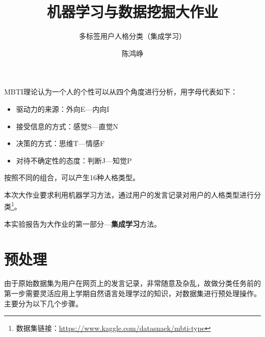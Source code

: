 \documentclass[logo,reportComp]{thesis}
\title{机器学习与数据挖掘大作业}
\subtitle{多标签用户人格分类（集成学习）}
\author{陈鸿峥}
\begin{document}
\maketitle
\tableofcontents

\newpage
MBTI理论认为一个人的个性可以从四个角度进行分析，用字母代表如下：
\begin{itemize}
    \item 驱动力的来源：外向E---内向I
    \item 接受信息的方式：感觉S---直觉N
    \item 决策的方式：思维T---情感F
    \item 对待不确定性的态度：判断J---知觉P
\end{itemize}
按照不同的组合，可以产生16种人格类型。

本次大作业要求利用机器学习方法，通过用户的发言记录对用户的人格类型进行分类\footnote{数据集链接：\url{https://www.kaggle.com/datasnaek/mbti-type}}。

本实验报告为大作业的第一部分---\textbf{集成学习}方法。

\section{预处理}
由于原始数据集为用户在网页上的发言记录，非常随意及杂乱，故做分类任务前的第一步需要灵活应用上学期自然语言处理学过的知识，对数据集进行预处理操作。
主要分为以下几个步骤。
\end{document}
